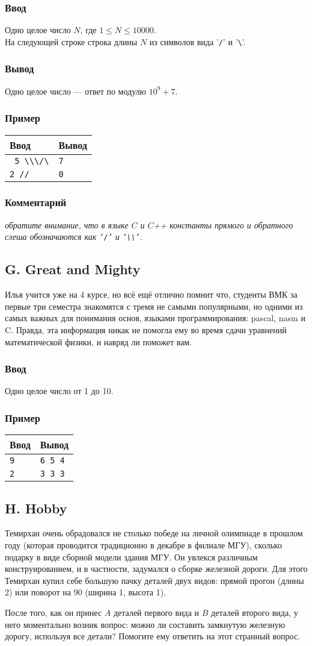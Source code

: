 \documentclass[10pt, a4paper]{article}
\newcommand{\informat}[1]
{
	\subsubsection*{Ввод} #1
}
\newcommand{\outformat}[1]
{
	\subsubsection*{Вывод} #1
}
\newcommand{\examplee}[4]
{
	\subsubsection*{Пример}
	\noindent
	\begin{center}
	\begin{tabularx}{\linewidth}{|X|X|}
	\hline
	Ввод 	& Вывод  	\\
	\hline
	{\tt #1} & {\tt #2}	\\
	\hline
	{\tt #3} & {\tt #4}	\\
	\hline
	\end{tabularx}
	\end{center}
}
\newcommand{\excomm}[1]
{
	\subsubsection*{Комментарий}
	\textit{#1}
}
\begin{document}
\informat{Одно целое число $N$, где $1 \le N \le 10000$. \\
На следующей строке строка длины $N$ из символов вида  '{\tt /}' и '{\tt \textbackslash}'.}

\outformat{Одно целое число --- ответ по модулю $10^9+7$.}

\examplee{
5 \newline
\textbackslash\textbackslash\textbackslash/\textbackslash}
{7}
{2 \newline
//}
{0}

\excomm{обратите внимание, что в языке $C$ и $C$++ константы прямого и обратного слеша обозначаются как {\tt '/'} и {\tt '\textbackslash\textbackslash'}.}



\subsection*{G. Great and Mighty}

Илья учится уже на 4 курсе, но всё ещё отлично помнит что, студенты ВМК за первые три семестра знакомятся с тремя не самыми популярными, но одними из самых важных для понимания основ, языками программирования: pascal, nasm и C. Правда, эта информация никак не помогла ему во время сдачи уравнений математической физики, и навряд ли поможет вам.

\informat{Одно целое число от 1 до 10.}

\examplee{9}{6 5 4}{2}{3 3 3}



\subsection*{H. Hobby}

Темирхан очень обрадовался не столько победе на личной олимпиаде в прошлом году (которая проводится традиционно в декабре в филиале МГУ), сколько подарку в виде сборной модели здания МГУ. Он увлекся различным конструированием, и в частности, задумался о сборке железной дороги. Для этого Темирхан купил себе большую пачку деталей двух видов: прямой прогон (длины 2) или поворот на 90 (ширина 1, высота 1). 



После того, как он принес $A$ деталей первого вида и $B$ деталей второго вида, у него моментально возник вопрос: можно ли составить замкнутую железную дорогу, используя все детали? Помогите ему ответить на этот странный вопрос.
\end{document}
